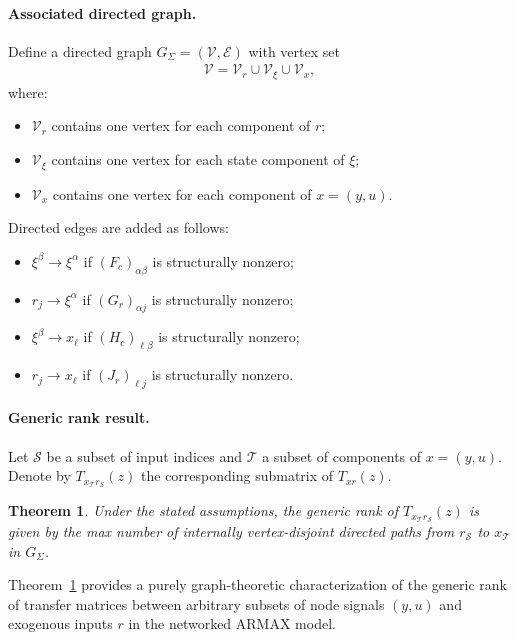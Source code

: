 \documentclass[11pt,a4paper]{article}
\newtheorem{theorem}{Theorem}
\begin{document}
\paragraph{Associated directed graph.}
Define a directed graph $G_\Sigma=(\mathcal V,\mathcal E)$ with vertex set
\begin{align*}
    \mathcal V = \mathcal V_r \cup \mathcal V_\xi \cup \mathcal V_x,
\end{align*}
where:
\begin{itemize}
\item $\mathcal V_r$ contains one vertex for each component of $r$;
\item $\mathcal V_\xi$ contains one vertex for each state component of $\xi$;
\item $\mathcal V_x$ contains one vertex for each component of
$x=(y,u)$.
\end{itemize}
Directed edges are added as follows:
\begin{itemize}
\item $\xi^\beta \to \xi^\alpha$ if $(F_c)_{\alpha\beta}$ is structurally nonzero;
\item $r_j \to \xi^\alpha$ if $(G_r)_{\alpha j}$ is structurally nonzero;
\item $\xi^\beta \to x_\ell$ if $(H_c)_{\ell\beta}$ is structurally nonzero;
\item $r_j \to x_\ell$ if $(J_r)_{\ell j}$ is structurally nonzero.
\end{itemize}

\paragraph{Generic rank result.}
Let $\mathcal S$ be a subset of input indices and $\mathcal T$ a subset of components of $x=(y,u)$. Denote by $T_{x_\mathcal T r_\mathcal S}(z)$ the corresponding submatrix of $T_{xr}(z)$.

\begin{theorem}
\label{thm:generic-rank-network}
Under the stated assumptions, the generic rank of $T_{x_\mathcal T r_\mathcal S}(z)$ is given by the max number of internally vertex-disjoint directed paths from $r_\mathcal S$ to $x_\mathcal T$ in $G_\Sigma$.
\end{theorem}


Theorem~\ref{thm:generic-rank-network} provides a purely graph-theoretic characterization of the generic rank of transfer matrices between arbitrary subsets of node signals $(y,u)$ and exogenous inputs $r$ in the networked ARMAX model.
\end{document}
